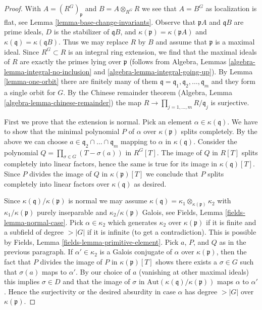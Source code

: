 \documentclass[10pt,a4paper]{amsart}
\theoremstyle{plain}
\theoremstyle{definition}
\theoremstyle{remark}
\numberwithin{equation}{subsection}
\begin{document}
\begin{proof}
With $A = (R^G)_\mathfrak p$ and $B = A \otimes_{R^G} R$ we see that $A = B^G$
as localization is flat, see Lemma \ref{lemma-base-change-invariants}.
Observe that $\mathfrak pA$ and $\mathfrak qB$ are prime ideals,
$D$ is the stabilizer of $\mathfrak qB$, and
$\kappa(\mathfrak p) = \kappa(\mathfrak pA)$ and
$\kappa(\mathfrak q) = \kappa(\mathfrak qB)$. Thus we may replace
$R$ by $B$ and assume that $\mathfrak p$ is a maximal ideal.
Since $R^G \subset R$ is an integral ring extension, we find
that the maximal ideals of $R$ are exactly the primes lying over
$\mathfrak p$ (follows from
Algebra, Lemmas \ref{algebra-lemma-integral-no-inclusion} and
\ref{algebra-lemma-integral-going-up}).
By Lemma \ref{lemma-one-orbit} there are finitely many of them
$\mathfrak q = \mathfrak q_1, \mathfrak q_2, \ldots, \mathfrak q_m$
and they form a single orbit for $G$.
By the Chinese remainder theorem
(Algebra, Lemma \ref{algebra-lemma-chinese-remainder}) the map
$R \to \prod_{j = 1, \ldots, m} R/\mathfrak q_j$ is surjective.

\medskip\noindent
First we prove that the extension is normal. Pick an element
$\alpha \in \kappa(\mathfrak q)$. We have to show that the
minimal polynomial $P$ of $\alpha$ over $\kappa(\mathfrak p)$
splits completely. By the above we can choose
$a \in \mathfrak q_2 \cap \ldots \cap \mathfrak q_m$
mapping to $\alpha$ in $\kappa(\mathfrak q)$.
Consider the polynomial $Q = \prod_{\sigma \in G} (T - \sigma(a))$
in $R^G[T]$. The image of $Q$ in $R[T]$ splits completely
into linear factors, hence the same is true for its
image in $\kappa(\mathfrak q)[T]$. Since $P$ divides
the image of $Q$ in $\kappa(\mathfrak p)[T]$ we conclude
that $P$ splits completely into linear factors over
$\kappa(\mathfrak q)$ as desired.

\medskip\noindent
Since $\kappa(\mathfrak q)/\kappa(\mathfrak p)$ is normal we may assume
$\kappa(\mathfrak q) = \kappa_1 \otimes_{\kappa(\mathfrak p)} \kappa_2$
with $\kappa_1/\kappa(\mathfrak p)$ purely inseparable and
$\kappa_2/\kappa(\mathfrak p)$ Galois, see
Fields, Lemma \ref{fields-lemma-normal-case}. Pick
$\alpha \in \kappa_2$ which generates $\kappa_2$ over $\kappa(\mathfrak p)$
if it is finite and a subfield of degree $> |G|$ if it is infinite
(to get a contradiction).
This is possible by Fields, Lemma \ref{fields-lemma-primitive-element}.
Pick $a$, $P$, and $Q$ as in the previous paragraph.
If $\alpha' \in \kappa_2$ is a Galois conjugate of $\alpha$ over
$\kappa(\mathfrak p)$, then the fact that $P$ divides the
image of $P$ in $\kappa(\mathfrak p)[T]$ shows there exists a
$\sigma \in G$ such that $\sigma(a)$ maps to $\alpha'$. By our choice of
$a$ (vanishing at other maximal ideals) this implies $\sigma \in D$ and
that the image of $\sigma$ in
$\text{Aut}(\kappa(\mathfrak q)/\kappa(\mathfrak p))$
maps $\alpha$ to $\alpha'$. Hence the surjectivity or the
desired absurdity
in case $\alpha$ has degree $> |G|$ over $\kappa(\mathfrak p)$.
\end{proof}
\end{document}
